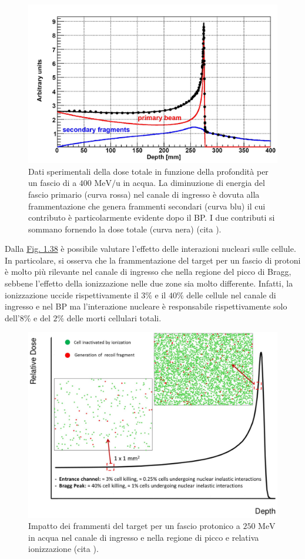 \documentclass[12pt,a4paper,twoside]{report}
\begin{document}
	\begin{figure}[H]
		\centering
	 	\includegraphics[width=0.9\linewidth]{late_release.jpg}
	 	\caption{Dati sperimentali della dose totale in funzione della profondità per un fascio di  a $400\mbox{ MeV/u}$ in acqua. La diminuzione di energia del fascio primario (curva rossa) nel canale di ingresso è dovuta alla frammentazione che genera frammenti secondari (curva blu) il cui contributo è particolarmente evidente dopo il BP. I due contributi si sommano fornendo la dose totale (curva nera) (cita
	 		).}
	 	\label{fig:late_release}
	\end{figure}
	Dalla \hyperref[fig:biol_effect_nuclear]{Fig. 1.38} è possibile valutare l'effetto delle interazioni nucleari sulle cellule. In particolare, si osserva che la frammentazione del target per un fascio di protoni è molto più rilevante nel canale di ingresso che nella regione del picco di Bragg, sebbene l'effetto della ionizzazione nelle due zone sia molto differente. Infatti, la ionizzazione uccide rispettivamente il $3\%$ e il $40\%$ delle cellule nel canale di ingresso e nel BP ma l'interazione nucleare è responsabile rispettivamente solo dell'$8\%$ e del $2\%$ delle morti cellulari totali.
	\begin{figure}[H]
	 	\centering
	 	\includegraphics[width=0.9\linewidth]{biol_effect_nuclear.png}
	 	\caption{Impatto dei frammenti del target per un fascio protonico a $250\mbox{ MeV}$ in acqua nel canale di ingresso e nella regione di picco e relativa ionizzazione (cita
	 		).}
	 	\label{fig:biol_effect_nuclear}
	\end{figure}		
\end{document}

